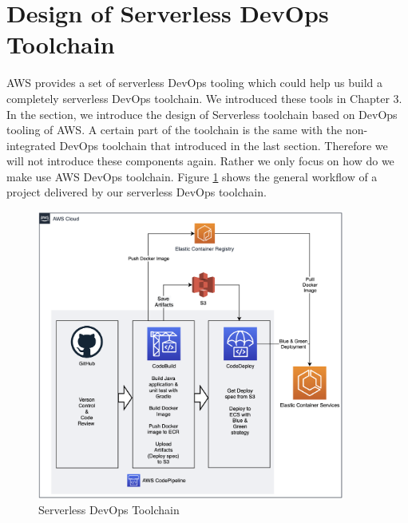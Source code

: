 \section{Design of Serverless DevOps Toolchain}
AWS provides a set of serverless DevOps tooling which could help us build a completely serverless DevOps toolchain. We introduced these tools in Chapter 3. In the section, we introduce the design of Serverless toolchain based on DevOps tooling of AWS. A certain part of the toolchain is the same with the non-integrated DevOps toolchain that introduced in the last section. Therefore we will not introduce these components again. Rather we only focus on how do we make use AWS DevOps toolchain. Figure \ref{fig:codepipeline} shows the general workflow of a project delivered by our serverless DevOps toolchain.
\begin{figure}[h]
 \centering
 \includegraphics[width=0.90\textwidth]{pics/codepipeline.png}
 \caption{Serverless DevOps Toolchain}
 \label{fig:codepipeline}
\end{figure}
